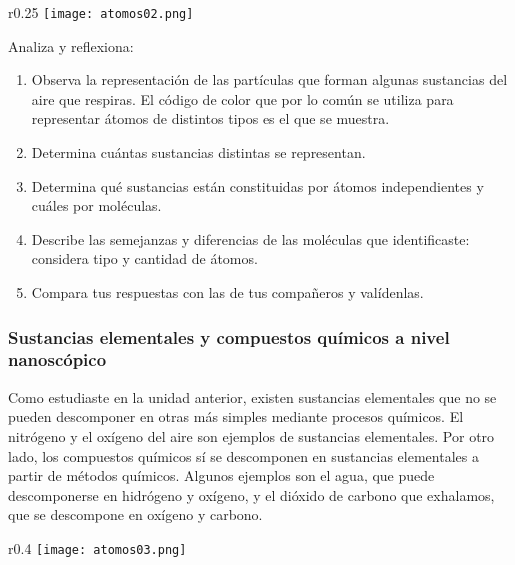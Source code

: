 \begin{boxK}
    \begin{wrapfigure}{r}{0.25\textwidth}
        \centering
        \texttt{[image: atomos02.png]}
        \label{fig:atomos02}
    \end{wrapfigure}
    Analiza y reflexiona:\\
    \begin{enumerate}
        \item Observa la representación de las partículas que
              forman algunas sustancias del aire que respiras.
              El código de color que por lo común se utiliza
              para representar átomos de distintos tipos es el
              que se muestra.
        \item Determina cuántas sustancias distintas se representan.
        \item Determina qué sustancias están constituidas por átomos independientes y cuáles por moléculas.
        \item Describe las semejanzas y diferencias de las moléculas que identificaste: considera tipo y cantidad de átomos.
        \item Compara tus respuestas con las de tus compañeros y valídenlas.
    \end{enumerate}%
\end{boxK}

\subsubsection{Sustancias elementales y compuestos químicos a nivel nanoscópico}

Como estudiaste en la unidad anterior, existen sustancias elementales que no se pueden descomponer
en otras más simples mediante procesos químicos. El nitrógeno y el oxígeno del aire son
ejemplos de sustancias elementales. Por otro lado, los compuestos
químicos sí se descomponen en sustancias elementales a partir
de métodos químicos. Algunos ejemplos son el agua, que puede
descomponerse en hidrógeno y oxígeno, y el dióxido de carbono
que exhalamos, que se descompone en oxígeno y carbono.\\

\begin{wrapfigure}{r}{0.4\textwidth}
    \centering
    \texttt{[image: atomos03.png]}
    \label{fig:atomos03}
\end{wrapfigure}

